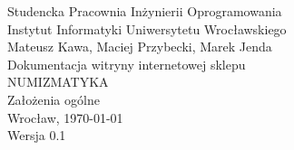 \documentclass[11pt,a4paper,leqno]{article}			%
\begin{document}
\begin{center}
\thispagestyle{empty} 					%
{\Large Studencka Pracownia Inżynierii Oprogramowania}\\[0.5cm]
{\large Instytut Informatyki Uniwersytetu Wrocławskiego}\\[6.0cm]


{\large Mateusz Kawa, Maciej Przybecki, Marek Jenda}\\[1.5cm]
{\huge Dokumentacja witryny internetowej sklepu }\\[0.5cm]
{\huge NUMIZMATYKA }\\[1.5cm]
{\large Założenia ogólne}\\[0.5cm]
\vfill
{\large Wrocław, \today}\\[0.5cm]
{\large Wersja 0.1}
\end{center}
\end{document}

